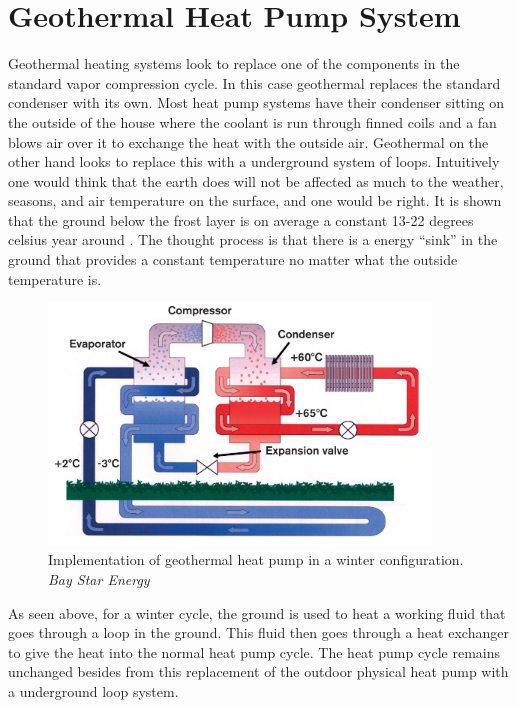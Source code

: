 \section{Geothermal Heat Pump System}
Geothermal heating systems look to replace one of the components in the standard vapor compression cycle. In this case geothermal replaces the standard condenser with its own. Most heat pump systems have their condenser sitting on the outside of the house where the coolant is run through finned coils and a fan blows air over it to exchange the heat with the outside air. Geothermal on the other hand looks to replace this with a underground system of loops. Intuitively one would think that the earth does will not be affected as much to the weather, seasons, and air temperature on the surface, and one would be right. It is shown that the ground below the frost layer is on average a constant 13-22 degrees celsius year around \cite{NRCSScan}. The thought process is that there is a energy ``sink'' in the ground that provides a constant temperature no matter what the outside temperature is.
%
\begin{figure}[H]
    \centering
    \includegraphics[width=4in]{pictures/Geothermal-Heatpump.png}
    \caption{Implementation of geothermal heat pump in a winter configuration. \textit{Bay Star Energy \cite{HowHeatPumpWorks}}}
\end{figure}
%
\noindent
As seen above, for a winter cycle, the ground is used to heat a working fluid that goes through a loop in the ground. This fluid then goes through a heat exchanger to give the heat into the normal heat pump cycle. The heat pump cycle remains unchanged besides from this replacement of the outdoor physical heat pump with a underground loop system.